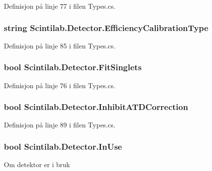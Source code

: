 Definisjon på linje 77 i filen Types.\+cs.

\hypertarget{class_scintilab_1_1_detector_a796c310b6aeedbce374b9386f910a499}{
\subsubsection[{Efficiency\+Calibration\+Type}]{\setlength{\rightskip}{0pt plus 5cm}string Scintilab.\+Detector.\+Efficiency\+Calibration\+Type}}\label{class_scintilab_1_1_detector_a796c310b6aeedbce374b9386f910a499}


Definisjon på linje 85 i filen Types.\+cs.

\hypertarget{class_scintilab_1_1_detector_a58aec3021d18afed051a50a18999a2d2}{
\subsubsection[{Fit\+Singlets}]{\setlength{\rightskip}{0pt plus 5cm}bool Scintilab.\+Detector.\+Fit\+Singlets}}\label{class_scintilab_1_1_detector_a58aec3021d18afed051a50a18999a2d2}


Definisjon på linje 76 i filen Types.\+cs.

\hypertarget{class_scintilab_1_1_detector_a2439ae55b919de48bade665495af4204}{
\subsubsection[{Inhibit\+A\+T\+D\+Correction}]{\setlength{\rightskip}{0pt plus 5cm}bool Scintilab.\+Detector.\+Inhibit\+A\+T\+D\+Correction}}\label{class_scintilab_1_1_detector_a2439ae55b919de48bade665495af4204}


Definisjon på linje 89 i filen Types.\+cs.

\hypertarget{class_scintilab_1_1_detector_aef0a8b33c3daf31ab0dcb374625e4c30}{
\subsubsection[{In\+Use}]{\setlength{\rightskip}{0pt plus 5cm}bool Scintilab.\+Detector.\+In\+Use}}\label{class_scintilab_1_1_detector_aef0a8b33c3daf31ab0dcb374625e4c30}
Om detektor er i bruk 

